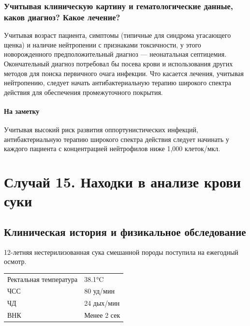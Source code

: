 \documentclass[a4paper,12pt]{book}
\begin{document}
\subsubsection*{Учитывая клиническую картину и гематологические данные, каков диагноз? Какое лечение?}
Учитывая возраст пациента, симптомы (типичные для синдрома угасающего щенка) и наличие нейтропении с признаками токсичности, у этого новорожденного предположительный диагноз — неонатальная септицемия. Окончательный диагноз потребовал бы посева крови и использования других методов для поиска первичного очага инфекции. Что касается лечения, учитывая нейтропению, следует начать антибактериальную терапию широкого спектра действия для обеспечения промежуточного покрытия.

\paragraph{На заметку}
Учитывая высокий риск развития оппортунистических инфекций, антибактериальную терапию широкого спектра действия следует начинать у каждого пациента с концентрацией нейтрофилов ниже 1,000 клеток/мкл.

\section{Случай 15. Находки в анализе крови суки}
\subsection*{Клиническая история и физикальное обследование}
12-летняя нестерилизованная сука смешанной породы поступила на ежегодный осмотр.

\begin{tabular}{@{}ll@{}}
\toprule
Ректальная температура & 38.1°C \\
ЧСС & 80 уд/мин \\
ЧД & 24 дых/мин \\
ВНК & Менее 2 сек \\
\bottomrule
\end{tabular}
\end{document}

